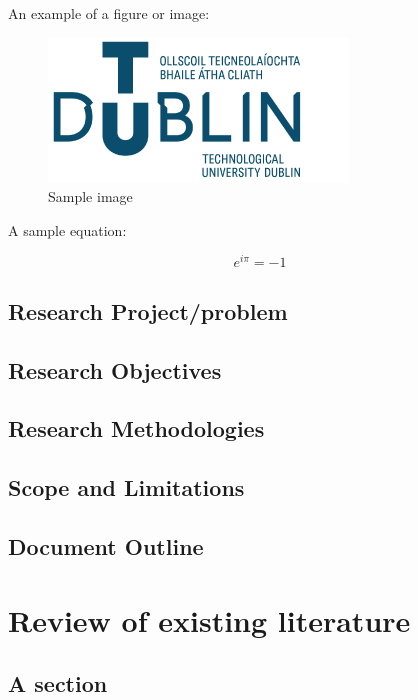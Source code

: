 \documentclass[oneside,12pt]{book}
\begin{document}
\par An example of a figure or image:

\begin{figure}[H]
    \centering
    \includegraphics[scale=0.5]{TU_logo}
    \caption{Sample image}
    \label{fig:logo}
\end{figure}

\par A sample equation:

\begin{equation}
e^{i\pi} = -1
\end{equation}

\section{Research Project/problem}

\section{Research Objectives}

\section{Research Methodologies}

\section{Scope and Limitations}

\section{Document Outline}


\chapter{Review of existing literature}

\section{A section}
\end{document}
